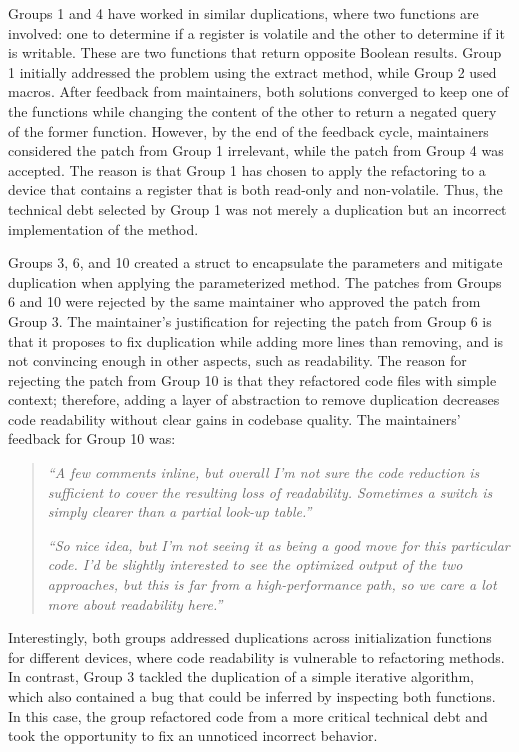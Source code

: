 \documentclass[10pt,conference]{IEEEtran}
\begin{document}
Groups 1 and 4 have worked in similar duplications, where two functions are involved: one to determine if a register is volatile and the other to determine if it is writable. These are two functions that return opposite Boolean results. Group 1 initially addressed the problem using the extract method, while Group 2 used macros. After feedback from maintainers, both solutions converged to keep one of the functions while changing the content of the other to return a negated query of the former function. However, by the end of the feedback cycle, maintainers considered the patch from Group 1 irrelevant, while the patch from Group 4 was accepted. The reason is that Group 1 has chosen to apply the refactoring to a device that contains a register that is both read-only and non-volatile. Thus, the technical debt selected by Group 1 was not merely a duplication but an incorrect implementation of the method.

Groups 3, 6, and 10 created a struct to encapsulate the parameters and mitigate duplication when applying the parameterized method. The patches from Groups 6 and 10 were rejected by the same maintainer who approved the patch from Group 3. The maintainer's justification for rejecting the patch from Group 6 is that it proposes to fix duplication while adding more lines than removing, and is not convincing enough in other aspects, such as readability. The reason for rejecting the patch from Group 10 is that they refactored code files with simple context; therefore, adding a layer of abstraction to remove duplication decreases code readability without clear gains in codebase quality. The maintainers' feedback for Group 10 was:
\begin{quote}

\textit{``A few comments inline, but overall I'm not sure the code reduction is sufficient to cover the resulting loss of readability. Sometimes a switch is simply clearer than a partial look-up table.''}

\textit{``So nice idea, but I'm not seeing it as being a good move for this particular code. I'd be slightly interested to see the optimized output of the two approaches, but this is far from a high-performance path, so we care a lot more about readability here.''} 
\end{quote}


Interestingly, both groups addressed duplications across initialization functions for different devices, where code readability is vulnerable to refactoring methods. In contrast, Group 3 tackled the duplication of a simple iterative algorithm, which also contained a bug that could be inferred by inspecting both functions. In this case, the group refactored code from a more critical technical debt and took the opportunity to fix an unnoticed incorrect behavior.
\end{document}
